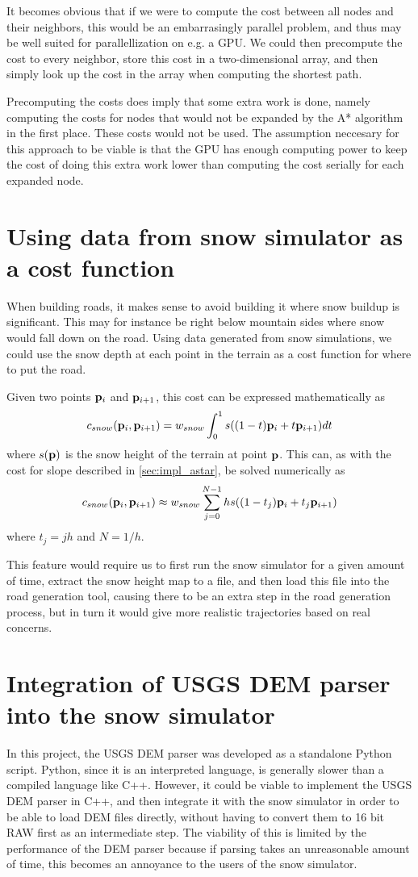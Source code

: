 It becomes obvious that if we were to compute the cost between all nodes and their neighbors, this would be an embarrasingly parallel problem, and thus may be well suited for parallellization on e.g. a GPU. We could then precompute the cost to every neighbor, store this cost in a two-dimensional array, and then simply look up the cost in the array when computing the shortest path. 

Precomputing the costs does imply that some extra work is done, namely computing the costs for nodes that would not be expanded by the A* algorithm in the first place. These costs would not be used. The assumption neccesary for this approach to be viable is that the GPU has enough computing power to keep the cost of doing this extra work lower than computing the cost serially for each expanded node. 

\section{Using data from snow simulator as a cost function}
When building roads, it makes sense to avoid building it where snow buildup is significant. This may for instance be right below mountain sides where snow would fall down on the road. Using data generated from snow simulations, we could use the snow depth at each point in the terrain as a cost function for where to put the road. 

Given two points ${\mathbf p}_i$ and ${\mathbf p}_{i+1}$, this cost can be expressed mathematically as
$$
c_{snow}({\mathbf p}_i, {\mathbf p}_{i+1}) = w_{snow}\int_{0}^{1} s((1-t){\mathbf p}_i+t{\mathbf p}_{i+1}) dt
$$
where $s({\mathbf p})$ is the snow height of the terrain at point ${\mathbf p}$. This can, as with the cost for slope described in \ref{sec:impl_astar}, be solved numerically as
$$
c_{snow}({\mathbf p}_i, {\mathbf p}_{i+1}) \approx w_{snow}\sum_{j=0}^{N-1} hs((1-t_j){\mathbf p}_i+t_j{\mathbf p}_{i+1}) 
$$
where $t_j=jh$ and $N=1/h$.

This feature would require us to first run the snow simulator for a given amount of time, extract the snow height map to a file, and then load this file into the road generation tool, causing there to be an extra step in the road generation process, but in turn it would give more realistic trajectories based on real concerns.


\section{Integration of USGS DEM parser into the snow simulator}
\label{sec:future_usgsdem}
In this project, the USGS DEM parser was developed as a standalone Python script. Python, since it is an interpreted language, is generally slower than a compiled language like C++. However, it could be viable to implement the USGS DEM parser in C++, and then integrate it with the snow simulator in order to be able to load DEM files directly, without having to convert them to 16 bit RAW first as an intermediate step. The viability of this is limited by the performance of the DEM parser because if parsing takes an unreasonable amount of time, this becomes an annoyance to the users of the snow simulator.

